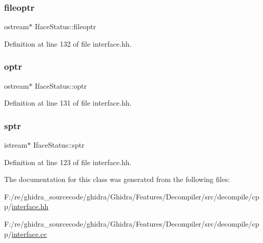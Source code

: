 \subsubsection{\texorpdfstring{fileoptr}{fileoptr}}
{\footnotesize\ttfamily ostream$\ast$ Iface\+Status\+::fileoptr}



Definition at line 132 of file interface.\+hh.

\mbox{\label{class_iface_status_a10ef65be4b8810a0445aa3ddf113e5b4}} 
\subsubsection{\texorpdfstring{optr}{optr}}
{\footnotesize\ttfamily ostream$\ast$ Iface\+Status\+::optr}



Definition at line 131 of file interface.\+hh.

\mbox{\label{class_iface_status_a0f9b2e74d61ba5b4658bc1ee994fbe62}} 
\subsubsection{\texorpdfstring{sptr}{sptr}}
{\footnotesize\ttfamily istream$\ast$ Iface\+Status\+::sptr\hspace{0.3cm}{\ttfamily [protected]}}



Definition at line 123 of file interface.\+hh.



The documentation for this class was generated from the following files\+:\begin{DoxyCompactItemize}
\item 
F\+:/re/ghidra\+\_\+sourcecode/ghidra/\+Ghidra/\+Features/\+Decompiler/src/decompile/cpp/\mbox{\hyperlink{interface_8hh}{interface.\+hh}}\item 
F\+:/re/ghidra\+\_\+sourcecode/ghidra/\+Ghidra/\+Features/\+Decompiler/src/decompile/cpp/\mbox{\hyperlink{interface_8cc}{interface.\+cc}}\end{DoxyCompactItemize}
